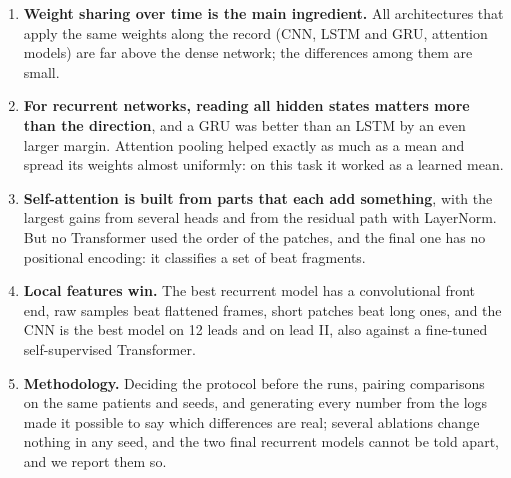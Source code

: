 \begin{enumerate}[leftmargin=1.4em,itemsep=2pt]
  \item \textbf{Weight sharing over time is the main ingredient.} All architectures that apply the same
        weights along the record (CNN, LSTM and GRU, attention models) are far above the dense network; the
        differences among them are small.
  \item \textbf{For recurrent networks, reading all hidden states matters more than the
        direction}, and a GRU was better than an LSTM by an even larger margin. Attention pooling helped exactly as much as a mean
        and spread its weights almost uniformly: on this task it worked as a learned mean.
  \item \textbf{Self-attention is built from parts that each add something}, with the largest gains from
        several heads and from the residual path with LayerNorm. But no Transformer used the order of the
        patches, and the final one has no positional encoding: it classifies a set of beat fragments.
  \item \textbf{Local features win.} The best recurrent model has a convolutional front end, raw samples
        beat flattened frames, short patches beat long ones, and the CNN is the best model on 12 leads and
        on lead II, also against a fine-tuned self-supervised Transformer.
  \item \textbf{Methodology.} Deciding the protocol before the runs, pairing comparisons on the same
        patients and seeds, and generating every number from the logs made it possible to say which
        differences are real; several ablations change nothing in any seed, and the two final recurrent
        models cannot be told apart, and we report them so.
\end{enumerate}
